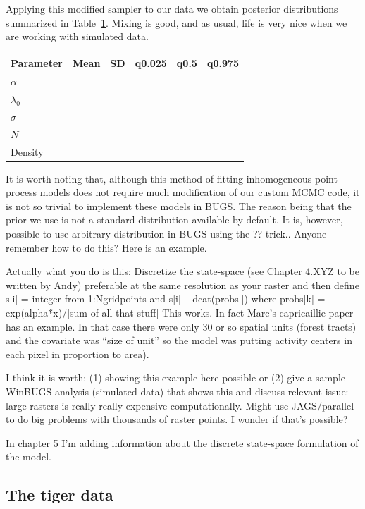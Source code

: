Applying this modified sampler to our data we obtain posterior
distributions summarized in Table~\ref{tab:simIPP}. Mixing is good, and as usual,
life is very nice when we are working with simulated data.

\begin{table}
\centering
\begin{tabular}{lccccc}
Parameter & Mean & SD  & q0.025 & q0.5 & q0.975 \\
\hline
$\alpha$    &&&&& \\
$\lambda_0$  &&&&& \\
$\sigma$    &&&&& \\
$N$        &&&&& \\
Density     &&&&& \\
\hline
\end{tabular}
\label{tab:simIPP}
\end{table}

It is worth noting that, although this method of fitting inhomogeneous
point process models does not require much modification of our custom MCMC
code, it is not so trivial to
implement these models in BUGS. The reason being
that the prior we use is not a standard distribution available by
default. It is, however, possible to use arbitrary distribution in
BUGS using the ??-trick.. Anyone remember how to do this? Here is an
example.



Actually what you do is this: Discretize the state-space (see Chapter
4.XYZ to be written by Andy) preferable at the same resolution as your
raster and then define s[i] = integer from 1:Ngridpoints and
s[i] ~ dcat(probs[])
where
probs[k] = exp(alpha*x)/[sum of all that stuff]
This works.
In fact Marc's capricaillie paper has an example. In that case there
were only 30 or so spatial units (forest tracts) and the covariate was
``size of unit'' so the model was putting activity centers in each pixel
in proportion to area).

I think it is worth: (1) showing this example here possible or (2)
give a sample WinBUGS analysis (simulated data) that shows this and
discuss relevant issue: large rasters is really really expensive
computationally. Might use JAGS/parallel to do big problems with
thousands of raster points. I wonder if that's possible?

In chapter 5 I'm adding information about the discrete state-space
formulation of the model.


\subsection{The tiger data}

